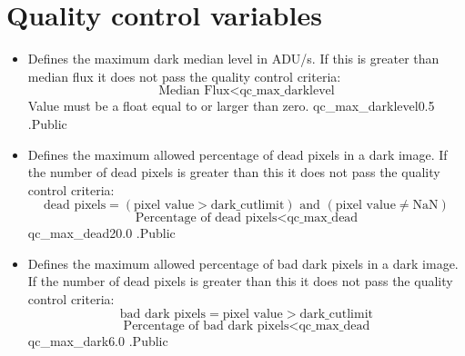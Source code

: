\clearpage
\newpage
\section{Quality control variables}
\label{ch:variables:qualitycontrol}

\begin{itemize}

\item {}
{Defines the maximum dark median level in ADU/s. If this is greater than median flux it does not pass the quality control criteria:
\begin{equation}
\text{Median Flux} < \text{qc\_max\_darklevel}
\end{equation}
Value must be a float equal to or larger than zero. 
}
{qc\_max\_darklevel}{0.5}
{\calDARK}{\constantsfile}{\calDARK.\progMAIN}{Public}


\item {}
{Defines the maximum allowed percentage of dead pixels in a dark image. If the number of dead pixels is greater than this it does not pass the quality control criteria:
\begin{equation}
\text{dead pixels} = (\text{pixel value} > \text{dark\_cutlimit}) \text{ and } (\text{pixel value} \neq \text{NaN})
\end{equation}
\begin{equation}
\text{Percentage of dead pixels} < \text{qc\_max\_dead}
\end{equation}
}
{qc\_max\_dead}{20.0}
{\calDARK}{\constantsfile}{\calDARK.\progMAIN}{Public}


\item {}
{Defines the maximum allowed percentage of bad dark pixels in a dark image. If the number of dead pixels is greater than this it does not pass the quality control criteria:
\begin{equation}
\text{bad dark pixels} = \text{pixel value} > \text{dark\_cutlimit}
\end{equation}
\begin{equation}
\text{Percentage of bad dark pixels} < \text{qc\_max\_dead}
\end{equation}
}
{qc\_max\_dark}{6.0}
{\calDARK}{\constantsfile}{\calDARK.\progMAIN}{Public}



\end{itemize}
